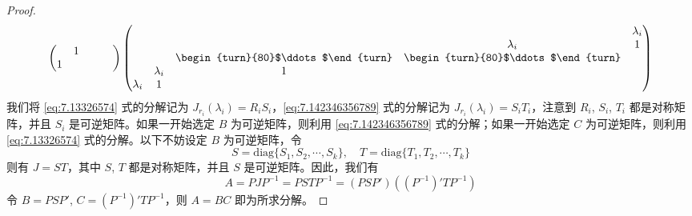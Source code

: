 \documentclass[../../main.tex]{subfiles}
\begin{document}
\begin{proof}
\begin{align}
\begin{pmatrix}
& 1 & & & \\
1 & & & &
\end{pmatrix}
\begin{pmatrix}
& & & & \lambda_i \\
& & & \lambda_i & 1 \\
& & \begin{turn}{80}$\ddots$\end{turn} & \begin{turn}{80}$\ddots$\end{turn} & \\
& \lambda_i & 1 & & \\
\lambda_i & 1 & & &
\end{pmatrix}
\label{eq:7.142346356789}
\end{align}
我们将 \eqref{eq:7.13326574} 式的分解记为 $J_{r_i}(\lambda_i) = R_iS_i$，\eqref{eq:7.142346356789} 式的分解记为 $J_{r_i}(\lambda_i) = S_iT_i$，注意到 $R_i$, $S_i$, $T_i$ 都是对称矩阵，并且 $S_i$ 是可逆矩阵。如果一开始选定 $B$ 为可逆矩阵，则利用 \eqref{eq:7.142346356789} 式的分解；如果一开始选定 $C$ 为可逆矩阵，则利用 \eqref{eq:7.13326574} 式的分解。以下不妨设定 $B$ 为可逆矩阵，令
\[
S = \mathrm{diag}\{S_1,S_2,\cdots,S_k\}, \quad T = \mathrm{diag}\{T_1,T_2,\cdots,T_k\}
\]
则有 $J = ST$，其中 $S$, $T$ 都是对称矩阵，并且 $S$ 是可逆矩阵。因此，我们有
\[
A = PJP^{-1} = PSTP^{-1} = (PSP')((P^{-1})'TP^{-1})
\]
令 $B = PSP'$, $C = (P^{-1})'TP^{-1}$，则 $A = BC$ 即为所求分解。

\end{proof}
\end{document}
